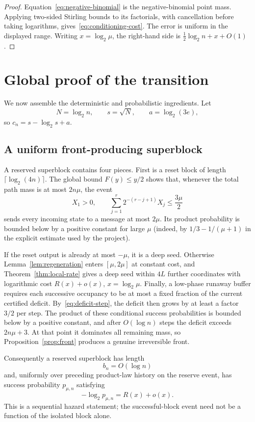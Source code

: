 \documentclass[11pt]{article}
\begin{document}
\begin{proof}
Equation~\eqref{eq:negative-binomial} is the negative-binomial point mass.
Applying two-sided Stirling bounds to its factorials, with cancellation before
taking logarithms, gives~\eqref{eq:conditioning-cost}.  The error is uniform
in the displayed range.  Writing $x=\log_2\mu$, the right-hand side is
$\frac12\log_2n+x+O(1)$.
\end{proof}

\section{Global proof of the transition}\label{sec:global}

We now assemble the deterministic and probabilistic ingredients.  Let
\[
 N=\log_2n,\qquad s=\sqrt N,\qquad a=\log_2(3e),
\]
so $c_n=s-\log_2s+a$.

\subsection{A uniform front-producing superblock}

A reserved superblock contains four pieces.  First is a reset block of length
$\lceil\log_2(4n)\rceil$.  The global bound $F(y)\le y/2$ shows that, whenever
the total path mass is at most $2n\mu$, the event
\[
 X_1>0,
 \qquad
 \sum_{j=1}^r2^{-(r-j+1)}X_j\le\frac{3\mu}{2}
 \tag{7.1}\label{eq:reset}
\]
sends every incoming state to a message at most $2\mu$.  Its product
probability is bounded below by a positive constant for large $\mu$ (indeed,
by $1/3-1/(\mu+1)$ in the explicit estimate used by the project).

If the reset output is already at most $-\mu$, it is a deep seed.  Otherwise
Lemma~\ref{lem:regeneration} enters $[\mu,2\mu]$ at constant cost, and
Theorem~\ref{thm:local-rate} gives a deep seed within $4L$ further coordinates
with logarithmic cost $R(x)+o(x)$, $x=\log_2\mu$.  Finally, a low-phase
runaway buffer requires each successive occupancy to be at most a fixed
fraction of the current certified deficit.  By~\eqref{eq:deficit-step}, the
deficit then grows by at least a factor $3/2$ per step.  The product of these
conditional success probabilities is bounded below by a positive constant,
and after $O(\log n)$ steps the deficit exceeds $2n\mu+3$.  At that point it
dominates all remaining mass, so Proposition~\ref{prop:front} produces a
genuine irreversible front.

Consequently a reserved superblock has length
\[
 b_n=O(\log n)
 \tag{7.2}\label{eq:block-length}
\]
and, uniformly over preceding product-law history on the reserve event, has
success probability $p_{\mu,n}$ satisfying
\[
 -\log_2p_{\mu,n}=R(x)+o(x).
 \tag{7.3}\label{eq:block-rate}
\]
This is a sequential hazard statement; the successful-block event need not be
a function of the isolated block alone.
\end{document}
